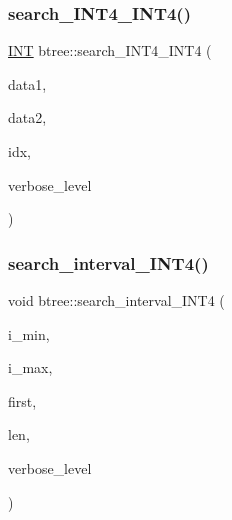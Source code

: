 \subsubsection{\texorpdfstring{search\+\_\+\+I\+N\+T4\+\_\+\+I\+N\+T4()}{search\_INT4\_INT4()}}
{\footnotesize\ttfamily \mbox{\hyperlink{galois_8h_a09fddde158a3a20bd2dcadb609de11dc}{I\+NT}} btree\+::search\+\_\+\+I\+N\+T4\+\_\+\+I\+N\+T4 (\begin{DoxyParamCaption}\item[{\mbox{\hyperlink{galois_8h_a09fddde158a3a20bd2dcadb609de11dc}{I\+NT}}}]{data1,  }\item[{\mbox{\hyperlink{galois_8h_a09fddde158a3a20bd2dcadb609de11dc}{I\+NT}}}]{data2,  }\item[{\mbox{\hyperlink{galois_8h_a09fddde158a3a20bd2dcadb609de11dc}{I\+NT}} \&}]{idx,  }\item[{\mbox{\hyperlink{galois_8h_a09fddde158a3a20bd2dcadb609de11dc}{I\+NT}}}]{verbose\+\_\+level }\end{DoxyParamCaption})}

\mbox{\label{classbtree_a8a89cbed12d4ac832d89dcc16dc6dcf2}} 
\subsubsection{\texorpdfstring{search\+\_\+interval\+\_\+\+I\+N\+T4()}{search\_interval\_INT4()}}
{\footnotesize\ttfamily void btree\+::search\+\_\+interval\+\_\+\+I\+N\+T4 (\begin{DoxyParamCaption}\item[{\mbox{\hyperlink{galois_8h_a09fddde158a3a20bd2dcadb609de11dc}{I\+NT}}}]{i\+\_\+min,  }\item[{\mbox{\hyperlink{galois_8h_a09fddde158a3a20bd2dcadb609de11dc}{I\+NT}}}]{i\+\_\+max,  }\item[{\mbox{\hyperlink{galois_8h_a09fddde158a3a20bd2dcadb609de11dc}{I\+NT}} \&}]{first,  }\item[{\mbox{\hyperlink{galois_8h_a09fddde158a3a20bd2dcadb609de11dc}{I\+NT}} \&}]{len,  }\item[{\mbox{\hyperlink{galois_8h_a09fddde158a3a20bd2dcadb609de11dc}{I\+NT}}}]{verbose\+\_\+level }\end{DoxyParamCaption})}

\mbox{\label{classbtree_a3bff689197882a625884b9625495c46f}} 
